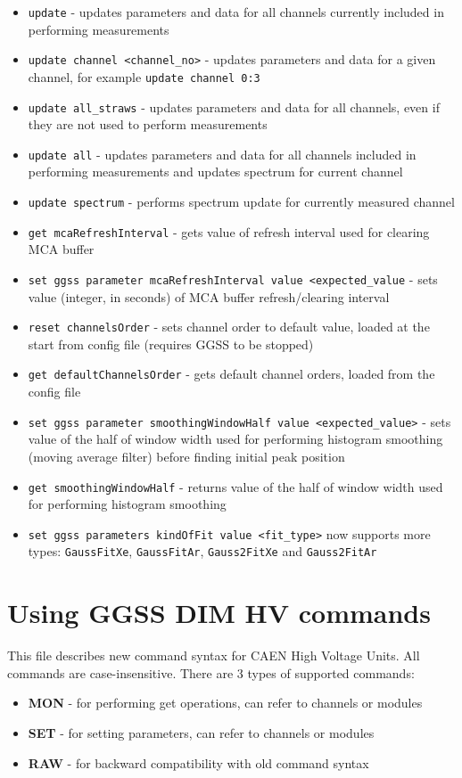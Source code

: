 \begin{itemize}
\item \lstinline{update} - updates parameters and data for all channels currently included in performing measurements
\item \lstinline{update channel <channel_no>} - updates parameters and data for a given channel, for example \lstinline{update channel 0:3}
\item \lstinline{update all_straws} - updates parameters and data for all channels, even if they are not used to perform measurements
\item \lstinline{update all} - updates parameters and data for all channels included in performing measurements and updates spectrum for current channel
\item \lstinline{update spectrum} - performs spectrum update for currently measured channel
\item \lstinline{get mcaRefreshInterval} - gets value of refresh interval used for clearing MCA buffer
\item \lstinline{set ggss parameter mcaRefreshInterval value <expected_value} - sets value (integer, in seconds) of MCA buffer refresh/clearing interval
\item \lstinline{reset channelsOrder} - sets channel order to default value, loaded at the start from config file (requires GGSS to be stopped)
\item \lstinline{get defaultChannelsOrder} - gets default channel orders, loaded from the config file
\item \lstinline{set ggss parameter smoothingWindowHalf value <expected_value>} - sets value of the half of window width used for performing histogram smoothing (moving average filter) before finding initial peak position
\item \lstinline{get smoothingWindowHalf} - returns value of the half of window width used for performing histogram smoothing
\item \lstinline{set ggss parameters kindOfFit value <fit_type>} now supports more types: \lstinline{GaussFitXe}, \lstinline{GaussFitAr}, \lstinline{Gauss2FitXe} and \lstinline{Gauss2FitAr}
\end{itemize}

\clearpage
\section{Using GGSS DIM HV commands}
This file describes new command syntax for CAEN High Voltage Units. All commands are case-insensitive. There are 3 types of supported commands:
\begin{itemize}
\item \textbf{MON} - for performing get operations, can refer to channels or modules
\item \textbf{SET} - for setting parameters, can refer to channels or modules
\item \textbf{RAW} - for backward compatibility with old command syntax
\end{itemize}

